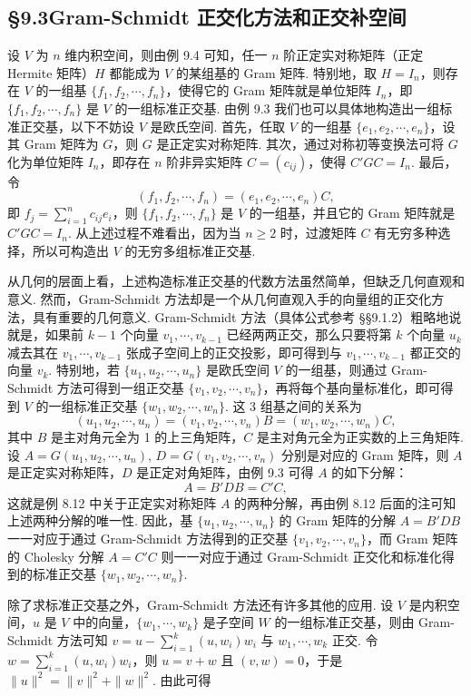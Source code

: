 \documentclass[UTF8,12pt,a4paper,fontset=fandol]{ctexart}
\begin{document}
\subsection*{§9.3\quad Gram-Schmidt 正交化方法和正交补空间}

设 $V$ 为 $n$ 维内积空间，则由例 9.4 可知，任一 $n$ 阶正定实对称矩阵（正定 Hermite 矩阵）$H$ 都能成为 $V$ 的某组基的 Gram 矩阵. 特别地，取 $H=I_n$，则存在 $V$ 的一组基 $\{f_1,f_2,\cdots,f_n\}$，使得它的 Gram 矩阵就是单位矩阵 $I_n$，即 $\{f_1,f_2,\cdots,f_n\}$ 是 $V$ 的一组标准正交基. 由例 9.3 我们也可以具体地构造出一组标准正交基，以下不妨设 $V$ 是欧氏空间. 首先，任取 $V$ 的一组基 $\{e_1,e_2,\cdots,e_n\}$，设其 Gram 矩阵为 $G$，则 $G$ 是正定实对称矩阵. 其次，通过对称初等变换法可将 $G$ 化为单位矩阵 $I_n$，即存在 $n$ 阶非异实矩阵 $C=(c_{ij})$，使得 $C'GC=I_n$. 最后，令
\[
(f_1,f_2,\cdots,f_n)=(e_1,e_2,\cdots,e_n)C,
\]
即 $f_j=\sum_{i=1}^n c_{ij}e_i$，则 $\{f_1,f_2,\cdots,f_n\}$ 是 $V$ 的一组基，并且它的 Gram 矩阵就是 $C'GC=I_n$. 从上述过程不难看出，因为当 $n\ge 2$ 时，过渡矩阵 $C$ 有无穷多种选择，所以可构造出 $V$ 的无穷多组标准正交基.

从几何的层面上看，上述构造标准正交基的代数方法虽然简单，但缺乏几何直观和意义. 然而，Gram-Schmidt 方法却是一个从几何直观入手的向量组的正交化方法，具有重要的几何意义. Gram-Schmidt 方法（具体公式参考 §§9.1.2）粗略地说就是，如果前 $k-1$ 个向量 $v_1,\cdots,v_{k-1}$ 已经两两正交，那么只要将第 $k$ 个向量 $u_k$ 减去其在 $v_1,\cdots,v_{k-1}$ 张成子空间上的正交投影，即可得到与 $v_1,\cdots,v_{k-1}$ 都正交的向量 $v_k$. 特别地，若 $\{u_1,u_2,\cdots,u_n\}$ 是欧氏空间 $V$ 的一组基，则通过 Gram-Schmidt 方法可得到一组正交基 $\{v_1,v_2,\cdots,v_n\}$，再将每个基向量标准化，即可得到 $V$ 的一组标准正交基 $\{w_1,w_2,\cdots,w_n\}$. 这 3 组基之间的关系为
\[
(u_1,u_2,\cdots,u_n)=(v_1,v_2,\cdots,v_n)B=(w_1,w_2,\cdots,w_n)C,
\]
其中 $B$ 是主对角元全为 1 的上三角矩阵，$C$ 是主对角元全为正实数的上三角矩阵. 设 $A=G(u_1,u_2,\cdots,u_n)$, $D=G(v_1,v_2,\cdots,v_n)$ 分别是对应的 Gram 矩阵，则 $A$ 是正定实对称矩阵，$D$ 是正定对角矩阵，由例 9.3 可得 $A$ 的如下分解：
\[
A=B'DB=C'C,
\]
这就是例 8.12 中关于正定实对称矩阵 $A$ 的两种分解，再由例 8.12 后面的注可知上述两种分解的唯一性. 因此，基 $\{u_1,u_2,\cdots,u_n\}$ 的 Gram 矩阵的分解 $A=B'DB$ 一一对应于通过 Gram-Schmidt 方法得到的正交基 $\{v_1,v_2,\cdots,v_n\}$，而 Gram 矩阵的 Cholesky 分解 $A=C'C$ 则一一对应于通过 Gram-Schmidt 正交化和标准化得到的标准正交基 $\{w_1,w_2,\cdots,w_n\}$.

除了求标准正交基之外，Gram-Schmidt 方法还有许多其他的应用. 设 $V$ 是内积空间，$u$ 是 $V$ 中的向量，$\{w_1,\cdots,w_k\}$ 是子空间 $W$ 的一组标准正交基，则由 Gram-Schmidt 方法可知 $v=u-\sum_{i=1}^k(u,w_i)w_i$ 与 $w_1,\cdots,w_k$ 正交. 令 $w=\sum_{i=1}^k(u,w_i)w_i$，则 $u=v+w$ 且 $(v,w)=0$，于是 $\|u\|^2=\|v\|^2+\|w\|^2$. 由此可得
\end{document}

